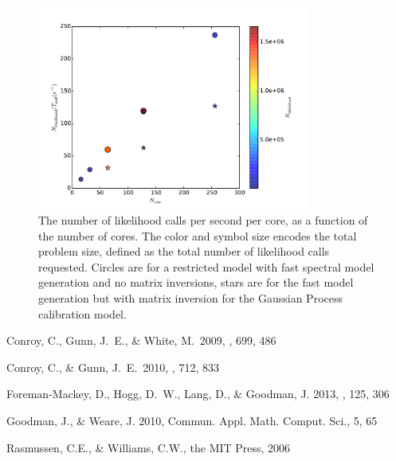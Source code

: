 \documentclass[11pt,preprint]{aastex}
\begin{document}
\begin{figure}
\begin{center}
\includegraphics[width=0.8\textwidth]{efficiency.pdf}
\caption{The number of likelihood calls per second per core, as a function of the number of cores.  The color and symbol size encodes the total problem size, defined as the total number of likelihood calls requested.  Circles are for a restricted model with fast spectral model generation and no matrix inversions, stars are for the fast model generation but with matrix inversion for the Gaussian Process calibration model. \label{fig:scaling}}
\end{center}
\end{figure}
\begin{thebibliography}

Conroy, C., Gunn, J.~E., \& White, M.\ 2009, \apj, 699, 486 

Conroy, C., \& Gunn, J.~E.\ 2010, \apj, 712, 833 

Foreman-Mackey, D., Hogg, D.~W., Lang, D., \& Goodman, J. 2013, \pasp, 125, 306 

Goodman, J., \& Weare,  J. 2010, Commun. Appl. Math. Comput. Sci., 5, 65

Rasmussen, C.E., \& Williams, C.W., the MIT Press, 2006

\end{thebibliography}
\end{document}
